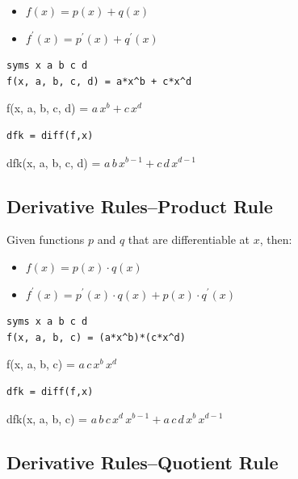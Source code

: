 \documentclass[
]{book}
\begin{document}
\begin{itemize}
\item
  \(\displaystyle f(x)=p(x)+q(x)\)
\item
  \(\displaystyle f^{\prime } (x)=p^{\prime } (x)+q^{\prime } (x)\)
\end{itemize}

\begin{verbatim}
syms x a b c d
f(x, a, b, c, d) = a*x^b + c*x^d
\end{verbatim}

f(x, a, b, c, d) = \(\displaystyle a\,x^b +c\,x^d\)

\begin{verbatim}
dfk = diff(f,x)
\end{verbatim}

dfk(x, a, b, c, d) = \(\displaystyle a\,b\,x^{b-1} +c\,d\,x^{d-1}\)

\hypertarget{derivative-rulesproduct-rule}{%
\subsection{Derivative Rules--Product Rule}\label{derivative-rulesproduct-rule}}

Given functions \(p\) and \(q\) that are differentiable at \(x\), then:

\begin{itemize}
\item
  \(\displaystyle f(x)=p(x)\cdot q(x)\)
\item
  \(\displaystyle f^{\prime } (x)=p^{\prime } (x)\cdot q(x)+p(x)\cdot q^{\prime } (x)\)
\end{itemize}

\begin{verbatim}
syms x a b c d
f(x, a, b, c) = (a*x^b)*(c*x^d)
\end{verbatim}

f(x, a, b, c) = \(\displaystyle a\,c\,x^b \,x^d\)

\begin{verbatim}
dfk = diff(f,x)
\end{verbatim}

dfk(x, a, b, c) =
\(\displaystyle a\,b\,c\,x^d \,x^{b-1} +a\,c\,d\,x^b \,x^{d-1}\)

\hypertarget{derivative-rulesquotient-rule}{%
\subsection{Derivative Rules--Quotient Rule}\label{derivative-rulesquotient-rule}}
\end{document}
